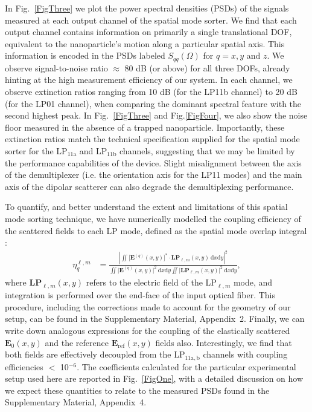 \documentclass[%
 reprint,
 amsmath,amssymb,
 aps,
pra,
]{revtex4-2}
\begin{document}
In Fig.~\ref{FigThree} we plot the power spectral densities (PSDs) of the signals measured at each output channel of the spatial mode sorter. We find that each output channel contains information on primarily a single translational DOF, equivalent to the nanoparticle's motion along a particular spatial axis. This information is encoded in the PSDs labeled $S_{qq}(\Omega)$ for $q = x,y$ and $z$. We observe signal-to-noise ratio $\approx$ 80 dB (or above) for all three DOFs, already hinting at the high measurement efficiency of our system. In each channel, we observe extinction ratios ranging from 10 dB (for the LP11b channel) to 20 dB (for the LP01 channel), when comparing the dominant spectral feature with the second highest peak. In Fig.~\ref{FigThree} and Fig.\ref{FigFour}, we also show the noise floor measured in the absence of a trapped nanoparticle. Importantly, these extinction ratios match the technical specification supplied for the spatial mode sorter for the LP$_{11\mathrm{a}}$ and LP$_{11\mathrm{b}}$ channels, suggesting that we may be limited by the performance capabilities of the device. Slight misalignment between the axis of the demultiplexer (i.e. the orientation axis for the LP11 modes) and the main axis of the dipolar scatterer can also degrade the demultiplexing performance.

To quantify, and better understand the extent and limitations of this spatial mode sorting technique, we have numerically modelled the coupling efficiency of the scattered fields to each LP mode, defined as the spatial mode overlap integral \cite{wagner_coupling_1982, vamivakas_phase-sensitive_2007}:
\begin{align}\label{CouplingEq}
    \eta_{q}^{\ell,m} &= \frac{\left|\iint \big[\boldsymbol{E}^{(q)}(x, y)\big]^{*} \cdot \textbf{LP}_{\ell,m}(x, y) ~ \mathrm{d}x\mathrm{d}y\right|^2}{\iint \big|\boldsymbol{E}^{(q)}(x, y)\big|^{2}~\mathrm{d}x\mathrm{d}y \iint \big|\textbf{LP}_{\ell,m}(x,y)\big|^{2}~\mathrm{d}x\mathrm{d}y} , 
\end{align}
where $\textbf{LP}_{\ell,m}(x, y)$ refers to the electric field of the LP$_{\ell,m}$ mode, and integration is performed over the end-face of the input optical fiber. This procedure, including the corrections made to account for the geometry of our setup, can be found in the Supplementary Material, Appendix~2. Finally, we can write down analogous expressions for the coupling of the elastically scattered $\boldsymbol{E}_{\mathrm{0}}(x, y)$ and the reference $\boldsymbol{E}_{\mathrm{ref}}(x, y)$ fields also. Interestingly, we find that both fields are effectively decoupled from the LP$_{11\mathrm{a,b}}$ channels with coupling efficiencies $<$ 10$^{-6}$. The coefficients calculated for the particular experimental setup used here are reported in Fig.~\ref{FigOne}, with a detailed discussion on how we expect these quantities to relate to the measured PSDs found in the Supplementary Material, Appendix~4.
\end{document}
